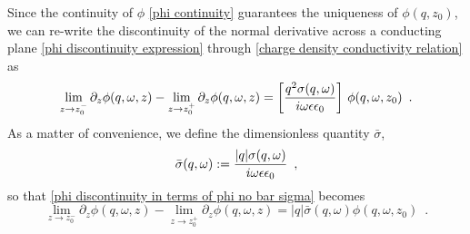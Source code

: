Since the continuity of $\phi$ \eqref{phi continuity} guarantees the uniqueness of $\phi(q,z_0)$, we can re-write the discontinuity of the normal derivative across a conducting plane \eqref{phi discontinuity expression} through \eqref{charge density conductivity relation} as
\begin{equation}
    \label{phi discontinuity in terms of phi no bar sigma}
    \lim_{z\to z_0^-}\partial_z\phi(q,\omega,z) - \lim_{z\to z_0^+}\partial_z\phi(q,\omega,z) = \left[\frac{q^2\sigma(q,\omega)}{i\omega\epsilon\epsilon_0}\right]\,\phi(q,\omega,z_0)
    \,\,\,.
\end{equation}
As a matter of convenience, we define the dimensionless quantity $\bar\sigma$,
\begin{equation}
    \label{bar sigma def}
    \bar\sigma(q,\omega):=
    \frac{|q|\sigma(q,\omega)}{i\omega\epsilon\epsilon_0}
    \,\,\,,
\end{equation}
so that \eqref{phi discontinuity in terms of phi no bar sigma} becomes
\begin{equation}
    \label{phi discontinuity in terms of phi}
    \lim_{z\to z_0^-}\partial_z\phi(q,\omega,z) - \lim_{z\to z_0^+}\partial_z\phi(q,\omega,z) = |q|\bar\sigma(q,\omega)\phi(q,\omega,z_0)
    \,\,\,.
\end{equation}

